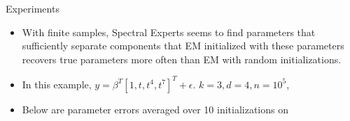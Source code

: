 \begin{block}{Experiments}
  \begin{itemize}
      \item With finite samples, Spectral Experts seems to find parameters
        that sufficiently separate components that EM initialized with
        these parameters recovers true parameters more often than EM with random initializations.
  \item In this example, $y = \beta^T [ 1, t, t^4 ,t^7 ]^T + \epsilon$. $k = 3, d = 4, n = 10^5$,
  \item Below are parameter errors averaged over 10 initializations on

\end{itemize}
\end{block}
